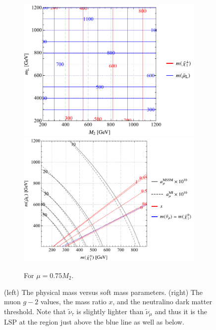 \documentclass[a4paper,10pt,captions=tableheading,DIV=14]{scrartcl}
\numberwithin{equation}{section}
\begin{document}
\begin{figure}[p]
\begin{subfigure}[b]{\textwidth}
 \includegraphics[scale=0.6]{../plots/plot_spectrum_tab3_massplot.pdf}
\hfill
 \includegraphics[scale=0.6]{../plots/plot_spectrum_tab3_physplot.pdf}
\caption{\label{fig:spectra-tab3} For $\mu=0.75M_2$.}
\end{subfigure}


\caption{\label{fig:spectra}(left) The physical mass versus soft mass parameters. (right) The muon $g-2$ values, the mass ratio $x$, and the neutralino dark matter threshold. Note that $\tilde\nu_\tau$ is slightly lighter than $\tilde\nu_\mu$ and thus it is the LSP at the region just above the blue line as well as below.}

\end{figure}
\end{document}
